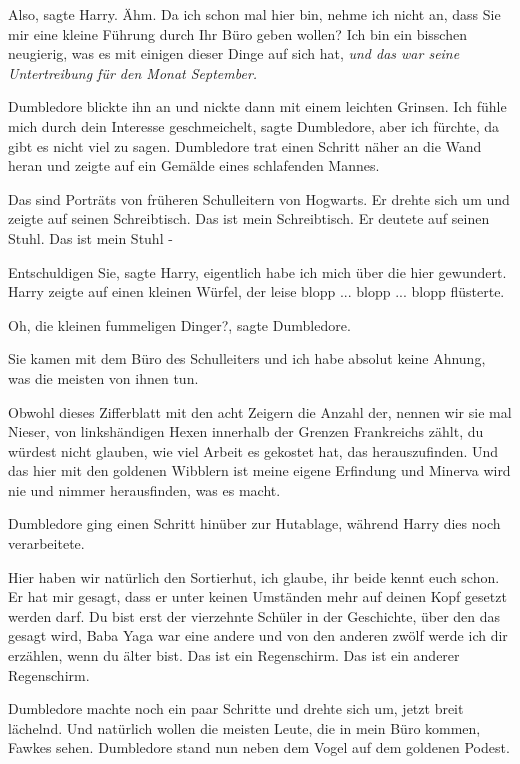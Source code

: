 \glqq Also\grqq{}, sagte Harry. \glqq Ähm. Da ich schon mal hier bin, nehme ich
nicht an, dass Sie mir eine kleine Führung durch Ihr Büro geben wollen? Ich bin
ein bisschen neugierig, was es mit einigen dieser Dinge auf sich hat\grqq{},
\emph{und das war seine Untertreibung für den Monat September.}

Dumbledore blickte ihn an und nickte dann mit einem leichten Grinsen. \glqq Ich
fühle mich durch dein Interesse geschmeichelt\grqq{}, sagte Dumbledore, \glqq
aber ich fürchte, da gibt es nicht viel zu sagen.\grqq{} Dumbledore trat einen
Schritt näher an die Wand heran und zeigte auf ein Gemälde eines schlafenden
Mannes.

\glqq Das sind Porträts von früheren Schulleitern von Hogwarts.\grqq{} Er drehte
sich um und zeigte auf seinen Schreibtisch. \glqq Das ist mein
Schreibtisch.\grqq{} Er deutete auf seinen Stuhl. \glqq Das ist mein Stuhl
-\grqq{}

\glqq Entschuldigen Sie\grqq{}, sagte Harry, \glqq eigentlich habe ich mich über
die hier gewundert.\grqq{} Harry zeigte auf einen kleinen Würfel, der leise
\glqq blopp ... blopp ... blopp\grqq{} flüsterte.

\glqq Oh, die kleinen fummeligen Dinger?\grqq{}, sagte Dumbledore.

\glqq Sie kamen mit dem Büro des Schulleiters und ich habe absolut keine Ahnung,
was die meisten von ihnen tun.

Obwohl dieses Zifferblatt mit den acht Zeigern die Anzahl der, nennen wir sie
mal Nieser, von linkshändigen Hexen innerhalb der Grenzen Frankreichs zählt, du
würdest nicht glauben, wie viel Arbeit es gekostet hat, das herauszufinden. Und
das hier mit den goldenen Wibblern ist meine eigene Erfindung und Minerva wird
nie und nimmer herausfinden, was es macht.\grqq{}

Dumbledore ging einen Schritt hinüber zur Hutablage, während Harry dies noch
verarbeitete.

\glqq Hier haben wir natürlich den Sortierhut, ich glaube, ihr beide kennt euch
schon. Er hat mir gesagt, dass er unter keinen Umständen mehr auf deinen Kopf
gesetzt werden darf. Du bist erst der vierzehnte Schüler in der Geschichte, über
den das gesagt wird, Baba Yaga war eine andere und von den anderen zwölf werde
ich dir erzählen, wenn du älter bist. Das ist ein Regenschirm. Das ist ein
anderer Regenschirm.\grqq{}

Dumbledore machte noch ein paar Schritte und drehte sich um, jetzt breit
lächelnd. \glqq Und natürlich wollen die meisten Leute, die in mein Büro kommen,
Fawkes sehen.\grqq{} Dumbledore stand nun neben dem Vogel auf dem goldenen
Podest.

